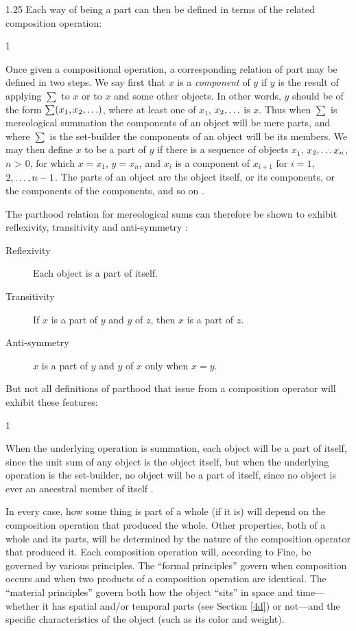 \documentclass[12pt,twoside]{reedfancy}
\newenvironment{squote}{%
	\begin{spacing}{1}
	\begin{list}{}{%
	\setlength{\labelwidth}{0pt}%
	\rightmargin\leftmargin%
	}
	\item\relax
	}{%
	\end{list}%
	\end{spacing}
	}
\begin{document}
\begin{spacing}{1.25}
Each way of being a part can then be defined in terms of the related
composition operation:

\begin{squote}
Once given a compositional operation, a corresponding relation of part
may be defined in two steps.  We say first that $x$ is a {\em
  component} of $y$ if $y$ is the result of applying $\sum$ to $x$ or
to $x$ and some other objects.  In other words, $y$ should be of the
form $\sum (x_{1}, x_{2}, \mathellipsis )$, where at least one of
$x_1$, $x_2, \mathellipsis$ is $x$.  Thus when $\sum$ is mereological
summation the components of an object will be mere parts, and where
$\sum$ is the set-builder the components of an object will be its
members.  We may then define $x$ to be a part of $y$ if there is a
sequence of objects $x_1$, $x_2, \mathellipsis x_n$, $n$
\textgreater{} $0$, for which $x = x_1$, $y = x_n$, and $x_i$ is a
component of $x_{i+1}$ for $i = 1$, $2, \mathellipsis, n-1$. The parts
of an object are the object itself, or its components, or the
components of the components, and so on \citep[567--568]{fine2010}.
\end{squote}

The parthood relation for mereological sums can therefore be shown to
exhibit reflexivity, transitivity and anti-symmetry
\citep[568]{fine2010}:

\begin{description}
\item[Reflexivity] Each object is a part of itself.
\item[Transitivity] If $x$ is a part of $y$ and $y$ of $z$, then $x$
  is a part of $z$.
\item[Anti-symmetry] $x$ is a part of $y$ and $y$ of $x$ only when $x
  = y$.
\end{description}

But not all definitions of parthood that issue from a composition
operator will exhibit these features:

\begin{squote}
When the underlying operation is summation, each object will be a part
of itself, since the unit sum of any object is the object itself, but
when the underlying operation is the set-builder, no object will be a
part of itself, since no object is ever an ancestral member of itself
\citep[569]{fine2010}.
\end{squote}

In every case, how some thing is part of a whole (if it is) will
depend on the composition operation that produced the whole.  Other
properties, both of a whole and its parts, will be determined by the
nature of the composition operator that produced it.  Each composition
operation will, according to Fine, be governed by various principles.
The ``formal principles'' govern when composition occurs and when two
products of a composition operation are identical.  The ``material
principles'' govern both how the object ``sits'' in space and
time---whether it has spatial and/or temporal parts (see Section
\ref{4d}) or not---and the specific characteristics of the object
(such as its color and weight).


\end{spacing}
\end{document}
